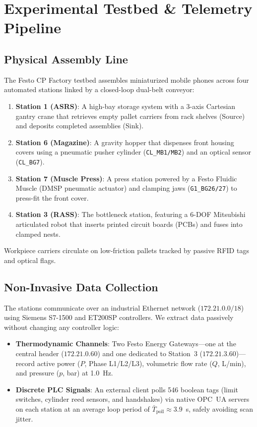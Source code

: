 \documentclass[journal]{IEEEtran}
\begin{document}
\section{Experimental Testbed \& Telemetry Pipeline}
\label{sec:testbed}

\subsection{Physical Assembly Line}
The Festo CP Factory testbed assembles miniaturized mobile phones across four automated stations linked by a closed-loop dual-belt conveyor:
\begin{enumerate}
    \item \textbf{Station 1 (ASRS)}: A high-bay storage system with a 3-axis Cartesian gantry crane that retrieves empty pallet carriers from rack shelves (Source) and deposits completed assemblies (Sink).
    \item \textbf{Station 6 (Magazine)}: A gravity hopper that dispenses front housing covers using a pneumatic pusher cylinder (\texttt{CL\_MB1/MB2}) and an optical sensor (\texttt{CL\_BG7}).
    \item \textbf{Station 7 (Muscle Press)}: A press station powered by a Festo Fluidic Muscle (DMSP pneumatic actuator) and clamping jaws (\texttt{G1\_BG26/27}) to press-fit the front cover.
    \item \textbf{Station 3 (RASS)}: The bottleneck station, featuring a 6-DOF Mitsubishi articulated robot that inserts printed circuit boards (PCBs) and fuses into clamped nests.
\end{enumerate}
Workpiece carriers circulate on low-friction pallets tracked by passive RFID tags and optical flags.

\subsection{Non-Invasive Data Collection}
The stations communicate over an industrial Ethernet network ($172.21.0.0/18$) using Siemens S7-1500 and ET200SP controllers. We extract data passively without changing any controller logic:
\begin{itemize}
    \item \textbf{Thermodynamic Channels}: Two Festo Energy Gateways---one at the central header ($172.21.0.60$) and one dedicated to Station~3 ($172.21.3.60$)---record active power ($P$, Phase L1/L2/L3), volumetric flow rate ($Q$, L/min), and pressure ($p$, bar) at 1.0~Hz.
    \item \textbf{Discrete PLC Signals}: An external client polls 546 boolean tags (limit switches, cylinder reed sensors, and handshakes) via native OPC~UA servers on each station at an average loop period of $\bar{T}_{\text{poll}} \approx 3.9$~s, safely avoiding scan jitter.
\end{itemize}
\end{document}
